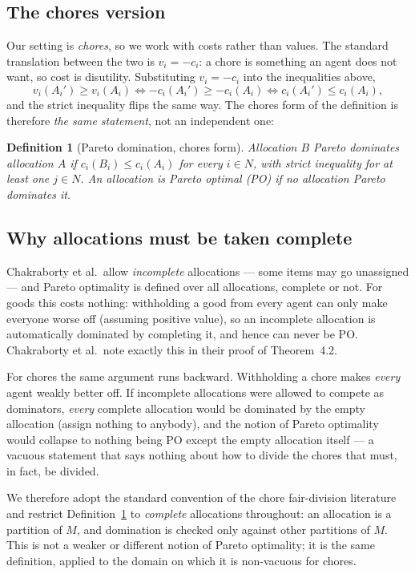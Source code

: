 \documentclass[11pt]{article}
\newtheorem{definition}{Definition}[section]
\newcommand{\N}{N}
\newcommand{\Mset}{M}
\begin{document}
\subsection{The chores version}

Our setting is \emph{chores}, so we work with costs rather than values. The
standard translation between the two is $v_i = -c_i$: a chore is something an
agent does not want, so cost is disutility. Substituting $v_i = -c_i$ into the
inequalities above,
\[
  v_i(A_i') \ge v_i(A_i)
  \iff -c_i(A_i') \ge -c_i(A_i)
  \iff c_i(A_i') \le c_i(A_i),
\]
and the strict inequality flips the same way. The chores form of the
definition is therefore \emph{the same statement}, not an independent one:

\begin{definition}[Pareto domination, chores form]
\label{def:podom}
Allocation $B$ \emph{Pareto dominates} allocation $A$ if
$c_i(B_i) \le c_i(A_i)$ for every $i \in \N$, with strict inequality for at
least one $j \in \N$. An allocation is \emph{Pareto optimal (PO)} if no
allocation Pareto dominates it.
\end{definition}

\subsection{Why allocations must be taken complete}
\label{sec:completeness}

Chakraborty et al.\ allow \emph{incomplete} allocations --- some items may go
unassigned --- and Pareto optimality is defined over all allocations,
complete or not. For goods this costs nothing: withholding a good from every
agent can only make everyone worse off (assuming positive value), so an
incomplete allocation is automatically dominated by completing it, and hence
can never be PO. Chakraborty et al.\ note exactly this in their proof of
Theorem~4.2.

For chores the same argument runs backward. Withholding a chore makes
\emph{every} agent weakly better off. If incomplete allocations were allowed
to compete as dominators, \emph{every} complete allocation would be dominated
by the empty allocation (assign nothing to anybody), and the notion of Pareto
optimality would collapse to nothing being PO except the empty allocation
itself --- a vacuous statement that says nothing about how to divide the
chores that must, in fact, be divided.

We therefore adopt the standard convention of the chore fair-division
literature and restrict Definition~\ref{def:podom} to \emph{complete}
allocations throughout: an allocation is a partition of $\Mset$, and
domination is checked only against other partitions of $\Mset$. This is not a
weaker or different notion of Pareto optimality; it is the same definition,
applied to the domain on which it is non-vacuous for chores.
\end{document}
